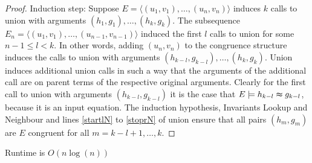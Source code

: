 \begin{proof}
Induction step: Suppose $E = \langle (u_1,v_1), \ldots, (u_n,v_n) \rangle$ induces $k$ calls to union with arguments $(h_1,g_1),\ldots,(h_k,g_k)$.
The subsequence $E_n = \langle (u_1,v_1), \ldots, (u_{n-1},v_{n-1}) \rangle$ induced the first $l$ calls to union for some $n-1 \leq l < k$.
In other words, adding $(u_n,v_n)$ to the congruence structure induces the calls to union with arguments $(h_{k-l},g_{k-l}),\ldots,(h_k,g_k)$.
Union induces additional union calls in such a way that the arguments of the additional call are on parent terms of the respective original arguments.
Clearly for the first call to union with arguments $(h_{k-l},g_{k-l})$ it is the case that $E \models h_{k-l} \thickapprox g_{k-l}$, because it is an input equation.
The induction hypothesis, Invariants Lookup and Neighbour and lines \ref{startlN} to \ref{stoprN} of union ensure that all pairs $(h_m,g_m)$ are $E$ congruent for all $m = k-l+1,\ldots,k$.

%
%
%


\end{proof}

\begin{proposition}[Runtime]

Runtime is $O(n \log(n))$

\end{proposition}

